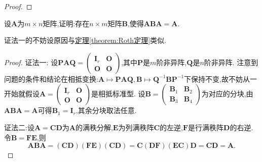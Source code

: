 \documentclass[../../main.tex]{subfiles}%
\begin{document}
\begin{proof}



\end{proof}

\begin{example}\label{example:3.26111}
设\(\boldsymbol{A}\)为\(m\times n\)矩阵,证明:存在\(n\times m\)矩阵\(\boldsymbol{B}\),使得\(\boldsymbol{A}\boldsymbol{B}\boldsymbol{A}=\boldsymbol{A}\).
\end{example}
\begin{note}
{\color{blue}证法一}的不妨设原因与\hyperref[theorem:Roth定理]{定理\ref{theorem:Roth定理}}类似.
\end{note}
\begin{proof}

{\color{blue}证法一:}
设\(\boldsymbol{P}\boldsymbol{A}\boldsymbol{Q}=\begin{pmatrix}
\boldsymbol{I}_r&\boldsymbol{O}\\
\boldsymbol{O}&\boldsymbol{O}
\end{pmatrix}\),其中\(\boldsymbol{P}\)是\(m\)阶非异阵,\(\boldsymbol{Q}\)是\(n\)阶非异阵. 注意到问题的条件和结论在相抵变换:\(\boldsymbol{A}\mapsto\boldsymbol{P}\boldsymbol{A}\boldsymbol{Q},\boldsymbol{B}\mapsto\boldsymbol{Q}^{-1}\boldsymbol{B}\boldsymbol{P}^{-1}\)下保持不变,故不妨从一开始就假设\(\boldsymbol{A}=\begin{pmatrix}
\boldsymbol{I}_r&\boldsymbol{O}\\
\boldsymbol{O}&\boldsymbol{O}
\end{pmatrix}\)是相抵标准型. 设\(\boldsymbol{B}=\begin{pmatrix}
\boldsymbol{B}_1&\boldsymbol{B}_2\\
\boldsymbol{B}_3&\boldsymbol{B}_4
\end{pmatrix}\)为对应的分块,由\(\boldsymbol{A}\boldsymbol{B}\boldsymbol{A}=\boldsymbol{A}\)可得\(\boldsymbol{B}_1=\boldsymbol{I}_r\),其余分块取法任意.

{\color{blue}证法二:}设\(\boldsymbol{A}=\boldsymbol{C}\boldsymbol{D}\)为\(\boldsymbol{A}\)的满秩分解,\(\boldsymbol{E}\)为列满秩阵\(\boldsymbol{C}\)的左逆,\(\boldsymbol{F}\)是行满秩阵\(\boldsymbol{D}\)的右逆. 令\(\boldsymbol{B}=\boldsymbol{F}\boldsymbol{E}\),则
\[
\boldsymbol{A}\boldsymbol{B}\boldsymbol{A}=(\boldsymbol{C}\boldsymbol{D})(\boldsymbol{F}\boldsymbol{E})(\boldsymbol{C}\boldsymbol{D})=\boldsymbol{C}(\boldsymbol{D}\boldsymbol{F})(\boldsymbol{E}\boldsymbol{C})\boldsymbol{D}=\boldsymbol{C}\boldsymbol{D}=\boldsymbol{A}.
\]

\end{proof}
\end{document}

